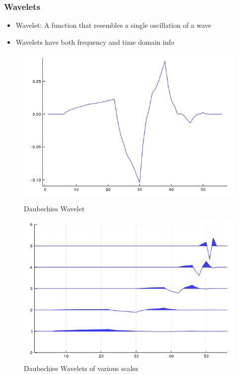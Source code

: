 \documentclass[aspectratio=169]{beamer}
\begin{document}
\begin{frame}
\frametitle{Wavelets}
    \begin{itemize}
        \item Wavelet: A function that resembles a single oscillation of a wave
        \item Wavelets have both frequency and time domain info
    \end{itemize}
    
    \begin{figure}
    \centering
    \begin{minipage}[b]{0.45\textwidth}
        \includegraphics[width=\textwidth]{daub.png}
        \caption{Daubechies Wavelet}
    \end{minipage}
     \hfill
    \begin{minipage}[b]{0.45\textwidth}
        \includegraphics[width=\textwidth]{daub_wiggle.png}
        \caption{Daubechies Wavelets of various scales}
     \end{minipage}
    \end{figure}
\end{frame}
\end{document}
